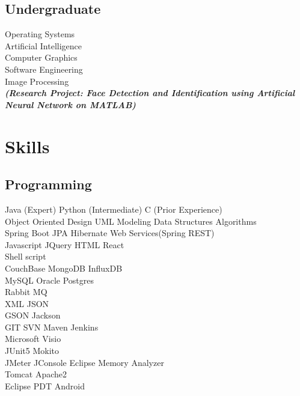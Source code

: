 \documentclass[]{kushal-resume}
\begin{document}
\begin{minipage}[t]{0.33\textwidth}
\subsection{Undergraduate}
Operating Systems \\
Artificial Intelligence  \\
Computer Graphics  \\
Software Engineering \\
Image Processing \\
{\footnotesize \textit{\textbf{(Research Project: Face Detection and Identification using Artificial Neural Network on MATLAB) }}} \\
\sectionsep


\section{Skills}
\subsection{Programming}
Java (Expert) \textbullet{} Python (Intermediate) \textbullet{} C (Prior Experience) \\
Object Oriented Design  \textbullet{} UML Modeling \textbullet{} Data Structures \textbullet{} Algorithms \\
Spring Boot \textbullet{} JPA \textbullet{} Hibernate \textbullet{} Web Services(Spring REST) \\
Javascript \textbullet{} JQuery \textbullet{} HTML \textbullet{} React \\
Shell script \\
CouchBase \textbullet{} MongoDB \textbullet{} InfluxDB  \\
MySQL \textbullet{} Oracle \textbullet{} Postgres \\
Rabbit MQ \\
XML \textbullet{} JSON \\
GSON \textbullet{} Jackson \\
GIT \textbullet{} SVN \textbullet{} Maven \textbullet{} Jenkins \\
Microsoft Visio \\
JUnit5 \textbullet{} Mokito \\
JMeter \textbullet{} JConsole \textbullet{} Eclipse Memory Analyzer \\
Tomcat \textbullet{} Apache2 \\
Eclipse PDT \textbullet{} Android \\
\sectionsep



%
%

\end{minipage} 
\end{document}
